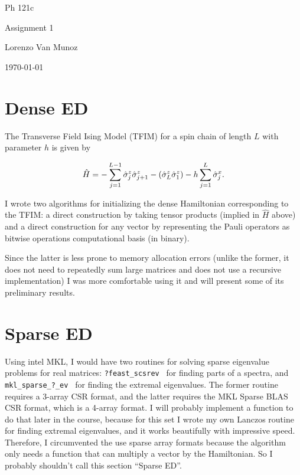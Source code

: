 \documentclass{article}
\begin{document}
{\centering

Ph 121c

Assignment 1

Lorenzo Van Munoz

\today

}

\tableofcontents

\newpage

\section{
Dense ED
}

The Transverse Field Ising Model (TFIM) for a spin chain
of length $L$ with parameter $h$ is given by

\begin{align}
    \hat H = - \sum_{j=1}^{L-1} \hat \sigma^z_{j} \hat \sigma^z_{j+1} 
            - \qty( \hat \sigma^z_{L}  \hat \sigma^z_{1} )
            - h\sum_{j=1}^{L}  \hat \sigma^x_{j}.
\end{align}

I wrote two algorithms for initializing the dense Hamiltonian
corresponding to the TFIM: a direct construction by taking
tensor products (implied in $\hat H$ above) and a direct construction
for any vector by representing the Pauli operators
as bitwise operations computational basis (in binary).

Since the latter is less prone to memory allocation errors 
(unlike the former, it does not need to repeatedly sum large matrices
and does not use a recursive implementation) I was more comfortable
using it and will present some of its preliminary results.

\newpage

\section{
Sparse ED
}

Using intel MKL, I would have two routines for solving
sparse eigenvalue problems for real matrices:
{\tt ?feast_scsrev } for finding parts of a spectra, and
{\tt mkl_sparse_?_ev } for finding the extremal eigenvalues.
The former routine requires a 3-array CSR format, and the latter
requires the MKL Sparse BLAS CSR format, which is a 4-array format.
I will probably implement a function to do that later in the course,
because for this set I wrote my own Lanczos routine for finding extremal
eigenvalues, and it works beautifully with impressive speed.
Therefore, I circumvented the use sparse array formats because the algorithm
only needs a function that can multiply a vector by the Hamiltonian.
So I probably shouldn't call this section ``Sparse ED''.
\end{document}
